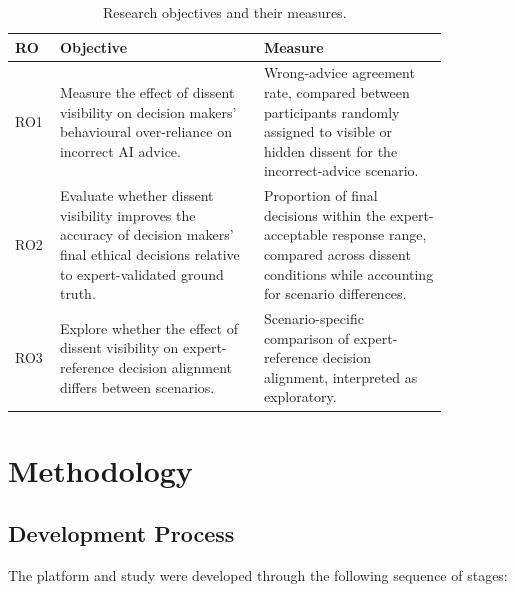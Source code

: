\documentclass[conference]{IEEEtran}
\begin{document}
\begin{table}[h]
\begin{center}
\caption{Research objectives and their measures.}
\label{tab:ros}
\begin{tabular}{p{0.06\linewidth}p{0.42\linewidth}p{0.38\linewidth}}
\hline
RO & Objective & Measure
\\
\hline
RO1 & Measure the effect of dissent visibility on decision makers' behavioural over-reliance on incorrect AI advice. & Wrong-advice agreement rate, compared between participants randomly assigned to visible or hidden dissent for the incorrect-advice scenario.
\\
RO2 & Evaluate whether dissent visibility improves the accuracy of decision makers' final ethical decisions relative to expert-validated ground truth. & Proportion of final decisions within the expert-acceptable response range, compared across dissent conditions while accounting for scenario differences.
\\
RO3 & Explore whether the effect of dissent visibility on expert-reference decision alignment differs between scenarios. & Scenario-specific comparison of expert-reference decision alignment, interpreted as exploratory.
\\
\hline
\end{tabular}
\end{center}
\end{table}

\section{Methodology}

\subsection{Development Process}

The platform and study were developed through the following sequence of stages:
\end{document}
